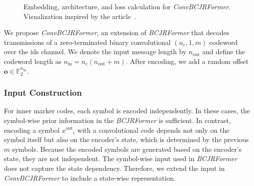 \documentclass[conference,letterpaperu]{IEEEtran}
\newcommand{\youtIx}{\ensuremath{x^{\text{out}}}}
\newcommand{\nin}{\ensuremath{n_{\text{in}}}}
\newcommand{\nout}{\ensuremath{n_{\text{out}}}}
\newcommand{\convn}{\ensuremath{n_\text{c}}}
\newcommand{\offset}{\ensuremath{\bm{o}}}
\begin{document}
\begin{figure}
    \caption{Embedding, architecture, and loss calculation for \textit{ConvBCJRFormer}. Visualization inspired by the article~\cite{park2025crossmpt}.}
    \label{fig:convolutionalBCJRFormerArchitecture}
\end{figure}
\label{sec:methConvBCJRFormer}
We propose \textit{ConvBCJRFormer}, an extension of \textit{BCJRFormer} that decodes transmissions of a zero-terminated binary convolutional $(\convn, 1, m)$ codeword over the \ac{ids} channel. We denote the input message length by $\nout$ and define the codeword length as $\nin = \convn(\nout + m)$. After encoding, we add a random offset $\offset \in \mathbb{F}_2^{\nin}$.

\subsubsection{Input Construction}

For inner marker codes, each symbol is encoded independently. In these cases, the symbol-wise prior information in the \textit{BCJRFormer} is sufficient. In contrast, encoding a symbol $\youtIx_i$ with a convolutional code depends not only on the symbol itself but also on the encoder's state, which is determined by the previous $m$ symbols. Because the encoded symbols are generated based on the encoder's state, they are not independent. The symbol-wise input used in \textit{BCJRFormer} does not capture the state dependency. Therefore, we extend the input in \textit{ConvBCJRFormer} to include a state-wise representation. 
\end{document}
